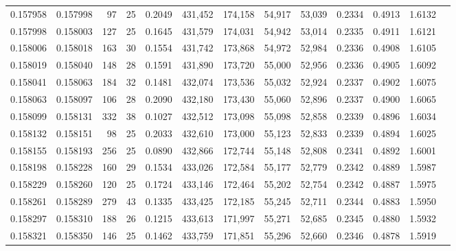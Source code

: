 \begin{tabular}{rrrrrrrrrrrrr}
0.157958 & 0.157998 &    97 &  25 &                                     0.2049 & 431,452 & 174,158 &  54,917 &  53,039 & 0.2334 & 0.4913 & 1.6132 \\
0.157998 & 0.158003 &   127 &  25 &                                     0.1645 & 431,579 & 174,031 &  54,942 &  53,014 & 0.2335 & 0.4911 & 1.6121 \\
0.158006 & 0.158018 &   163 &  30 &                                     0.1554 & 431,742 & 173,868 &  54,972 &  52,984 & 0.2336 & 0.4908 & 1.6105 \\
0.158019 & 0.158040 &   148 &  28 &                                     0.1591 & 431,890 & 173,720 &  55,000 &  52,956 & 0.2336 & 0.4905 & 1.6092 \\
0.158041 & 0.158063 &   184 &  32 &                                     0.1481 & 432,074 & 173,536 &  55,032 &  52,924 & 0.2337 & 0.4902 & 1.6075 \\
0.158063 & 0.158097 &   106 &  28 &                                     0.2090 & 432,180 & 173,430 &  55,060 &  52,896 & 0.2337 & 0.4900 & 1.6065 \\
0.158099 & 0.158131 &   332 &  38 &                                     0.1027 & 432,512 & 173,098 &  55,098 &  52,858 & 0.2339 & 0.4896 & 1.6034 \\
0.158132 & 0.158151 &    98 &  25 &                                     0.2033 & 432,610 & 173,000 &  55,123 &  52,833 & 0.2339 & 0.4894 & 1.6025 \\
0.158155 & 0.158193 &   256 &  25 &                                     0.0890 & 432,866 & 172,744 &  55,148 &  52,808 & 0.2341 & 0.4892 & 1.6001 \\
0.158198 & 0.158228 &   160 &  29 &                                     0.1534 & 433,026 & 172,584 &  55,177 &  52,779 & 0.2342 & 0.4889 & 1.5987 \\
0.158229 & 0.158260 &   120 &  25 &                                     0.1724 & 433,146 & 172,464 &  55,202 &  52,754 & 0.2342 & 0.4887 & 1.5975 \\
0.158261 & 0.158289 &   279 &  43 &                                     0.1335 & 433,425 & 172,185 &  55,245 &  52,711 & 0.2344 & 0.4883 & 1.5950 \\
0.158297 & 0.158310 &   188 &  26 &                                     0.1215 & 433,613 & 171,997 &  55,271 &  52,685 & 0.2345 & 0.4880 & 1.5932 \\
0.158321 & 0.158350 &   146 &  25 &                                     0.1462 & 433,759 & 171,851 &  55,296 &  52,660 & 0.2346 & 0.4878 & 1.5919 \\

\end{tabular}
